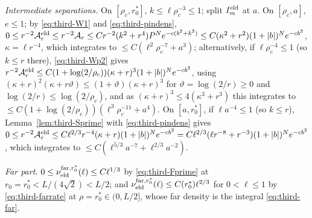 \emph{Intermediate separations.} On $[\rho_c,r_0^*]$, $k\le\ell\rho_c^{-3}\le1$; split $I^{\mathrm{eld}}_m$ at $a$. On $[\rho_c,a]$, $e\le1$; by \eqref{eq:third-W1} and \eqref{eq:third-pindens}, $0\le r^{-2}\mathcal A^{\mathrm{eld}}_r\le r^{-2}\mathcal A_r\le Cr^{-2}(k^2+r^4)P^Ne^{-c(b^2+k^2)}\le C(\kappa^2+r^2)(1+|b|)^Ne^{-cb^2}$, $\kappa=\ell r^{-4}$, which integrates to $\le C(\ell^2\rho_c^{-7}+a^3)$; alternatively, if $\ell\rho_c^{-4}\le1$ (so $k\le r$ there), \eqref{eq:third-Wp2} gives $r^{-2}\mathcal A^{\mathrm{eld}}_r\le C(1+\log(2/\rho_c))(\kappa+r)^3(1+|b|)^Ne^{-cb^2}$, using $(\kappa+r)^2(\kappa+r\vartheta)\le(1+\vartheta)(\kappa+r)^3$ for $\vartheta=\log(2/r)\ge0$ and $\log(2/r)\le\log(2/\rho_c)$, and as $(\kappa+r)^3\le4(\kappa^3+r^3)$ this integrates to $\le C(1+\log(2/\rho_c))(\ell^3\rho_c^{-11}+a^4)$. On $[a,r_0^*]$, if $\ell a^{-4}\le1$ (so $k\le r$), Lemma~\ref{lem:third-Sprime} with \eqref{eq:third-pindens} gives $0\le r^{-2}\mathcal A^{\mathrm{eld}}_r\le C\ell^{2/3}r^{-4}(\kappa+r)(1+|b|)^Ne^{-cb^2}=C\ell^{2/3}(\ell r^{-8}+r^{-3})(1+|b|)^Ne^{-cb^2}$, which integrates to $\le C(\ell^{5/3}a^{-7}+\ell^{2/3}a^{-2})$.

\emph{Far part.} $0\le\nu_{\mathrm{eld}}^{{\rm far},r_0^*}(\ell)\le C\ell^{1/3}$ by \eqref{eq:third-Fprime} at $r_0=r_0^*<L/(4\sqrt2)<L/2$; and $\nu_{\mathrm{eld}}^{{\rm far},r_0^*}(\ell)\le C(r_0^*)\ell^{2/3}$ for $0<\ell\le1$ by \eqref{eq:third-farrate} at $\rho=r_0^*\in(0,L/2]$, whose far density is the integral \eqref{eq:third-far}.


